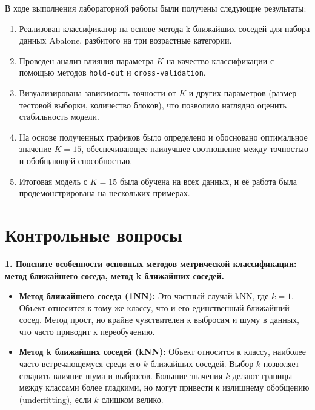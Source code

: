 В ходе выполнения лабораторной работы были получены следующие результаты:
\begin{enumerate}
    \item Реализован классификатор на основе метода k ближайших соседей для набора данных Abalone, разбитого на три возрастные категории.
    \item Проведен анализ влияния параметра \( K \) на качество классификации с помощью методов \texttt{hold-out} и \texttt{cross-validation}.
    \item Визуализирована зависимость точности от \( K \) и других параметров (размер тестовой выборки, количество блоков), что позволило наглядно оценить стабильность модели.
    \item На основе полученных графиков было определено и обосновано оптимальное значение \( K = 15 \), обеспечивающее наилучшее соотношение между точностью и обобщающей способностью.
    \item Итоговая модель с \( K=15 \) была обучена на всех данных, и её работа была продемонстрирована на нескольких примерах.
\end{enumerate}

\newpage
\section{Контрольные вопросы}

\textbf{1. Поясните особенности основных методов метрической классификации: метод ближайшего соседа, метод k ближайших соседей.}
\begin{itemize}
    \item \textbf{Метод ближайшего соседа (1NN):} Это частный случай kNN, где \(k=1\). Объект относится к тому же классу, что и его единственный ближайший сосед. Метод прост, но крайне чувствителен к выбросам и шуму в данных, что часто приводит к переобучению.
    \item \textbf{Метод k ближайших соседей (kNN):} Объект относится к классу, наиболее часто встречающемуся среди его \(k\) ближайших соседей. Выбор \(k\) позволяет сгладить влияние шума и выбросов. Большие значения \(k\) делают границы между классами более гладкими, но могут привести к излишнему обобщению (underfitting), если \(k\) слишком велико.
\end{itemize}

